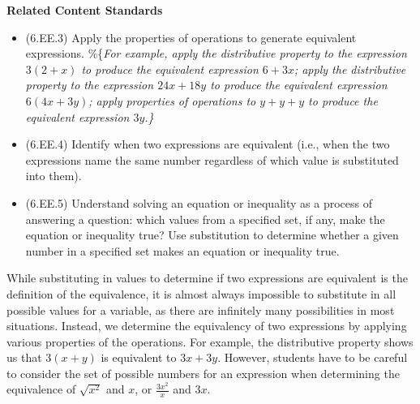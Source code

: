 \documentclass[
]{book}
\providecommand{\tightlist}{%
  \setlength{\itemsep}{0pt}\setlength{\parskip}{0pt}}
\newenvironment{standards}{}{}
\theoremstyle{definition}
\theoremstyle{definition}
\theoremstyle{definition}
\theoremstyle{definition}
\theoremstyle{remark}
\begin{document}
\begin{standards}

\begin{center}
\textbf{Related Content Standards}

\end{center}

\begin{itemize}
\tightlist
\item
  (6.EE.3) Apply the properties of operations to generate equivalent expressions. \%\{\em For example, apply the distributive property to the expression $3 (2 + x)$ to produce the equivalent expression $6 + 3x$; apply the distributive property to the expression $24x + 18y$ to produce the equivalent expression $6 (4x + 3y)$; apply properties of operations to $y + y + y$ to produce the equivalent expression $3y$.\}
\item
  (6.EE.4) Identify when two expressions are equivalent (i.e., when the two expressions name the same number regardless of which value is substituted into them).
\item
  (6.EE.5) Understand solving an equation or inequality as a process of answering a question: which values from a specified set, if any, make the equation or inequality true? Use substitution to determine whether a given number in a specified set makes an equation or inequality true.
\end{itemize}

\end{standards}

While substituting in values to determine if two expressions are equivalent is the definition of the equivalence, it is almost always impossible to substitute in all possible values for a variable, as there are infinitely many possibilities in most situations. Instead, we determine the equivalency of two expressions by applying various properties of the operations. For example, the distributive property shows us that \(3(x+y)\) is equivalent to \(3x+3y\). However, students have to be careful to consider the set of possible numbers for an expression when determining the equivalence of \(\sqrt{x^2}\) and \(x\), or \(\frac{3x^2}{x}\) and \(3x\).
\end{document}
